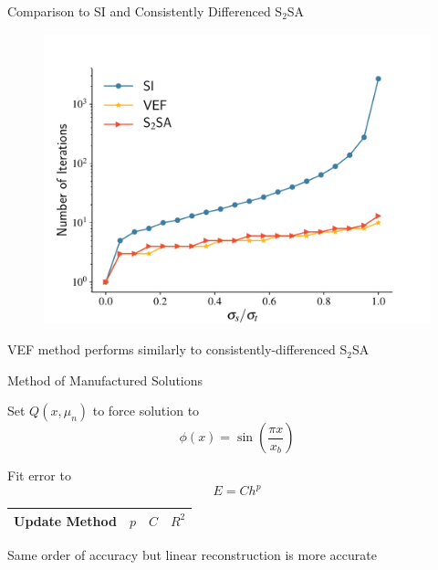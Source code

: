 \documentclass[10pt]{beamer}
\begin{document}
\begin{frame}{Comparison to SI and Consistently Differenced S$_2$SA}

	\begin{figure}[htb]
		\centering
		\includegraphics[width=.75\textwidth]{figs/si_vef_s2sa.pdf} 
		\label{fig:si_vef_s2sa}
	\end{figure}

	\begin{block}{}
		\centerline{VEF method performs similarly to consistently-differenced S$_2$SA}
	\end{block}

\end{frame}

\begin{frame}{Method of Manufactured Solutions}

	Set $Q(x, \mu_n)$ to force solution to 
	\begin{equation*}
		\phi(x) = \sin\left(\frac{\pi x}{x_b}\right)
	\end{equation*}

	Fit error to 
	\begin{equation*}
		E = C h^p 
	\end{equation*}

	\begin{table}[htb]
	\centering
	\begin{tabular}{|c|c|c|c|}
	\hline
	Update Method & $p$ & $C$ & $R^2$ \\ 
	\hline
		
	\hline
	\end{tabular}
	\label{tab:mms}
	\end{table}

	\pause 
	\begin{block}{}
		\centering Same order of accuracy but linear reconstruction is more accurate 
	\end{block}

\end{frame}
\end{document}
